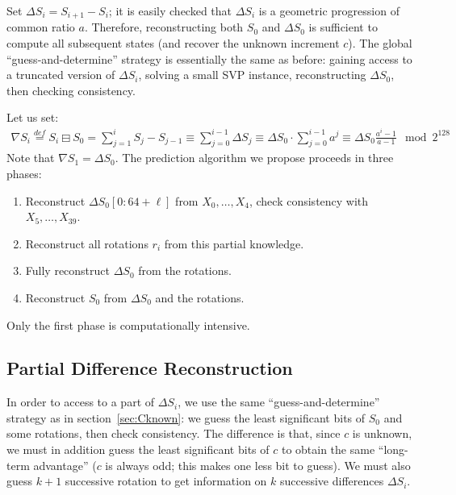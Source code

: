 \documentclass[submission,svgnames,journal=tosc]{iacrtrans}
\begin{document}

Set $\Delta S_i = S_{i+1} - S_i$; it is easily checked that $\Delta S_i$ is a
geometric progression of common ratio $a$. Therefore, reconstructing both $S_0$
and $\Delta S_0$ is sufficient to compute all subsequent states (and recover the
unknown increment $c$). The global ``guess-and-determine'' strategy is
essentially the same as before: gaining access to a truncated version of
$\Delta S_i$, solving a small SVP instance, reconstructing $\Delta S_0$, then
checking consistency.

Let us set:
\begin{align*}
  \nabla S_i \stackrel{def}{=} S_i \boxminus S_0 = \sum_{j=1}^i S_j - S_{j-1} \equiv \sum_{j=0}^{i-1} \Delta S_j \equiv \Delta S_0 \cdot \sum_{j=0}^{i-1} a^j \equiv \Delta S_0 \frac{a^i-1}{a-1} \mod 2^{128}
\end{align*}
Note that $\nabla S_1 = \Delta S_0$. The prediction algorithm we propose proceeds in three phases:
\begin{enumerate}
\item Reconstruct $\Delta S_0[0:64+\ell]$ from $X_0, \dots, X_{4}$, check consistency with $X_5, \dots, X_{39}$.
\item Reconstruct all rotations $r_i$ from this partial knowledge.
\item Fully reconstruct $\Delta S_0$ from the rotations.
\item Reconstruct $S_0$ from $\Delta S_0$ and the rotations.
\end{enumerate}

\noindent Only the first phase is computationally intensive. 

\subsection{Partial Difference Reconstruction}

In order to access to a part of $\Delta S_i$, we use the same
``guess-and-determine'' strategy as in section~\ref{sec:Cknown}: we guess the
least significant bits of $S_0$ and some rotations, then check consistency. The
difference is that, since $c$ is unknown, we must in addition guess the least
significant bits of $c$ to obtain the same ``long-term advantage'' ($c$ is
always odd; this makes one less bit to guess). We must also guess $k+1$
successive rotation to get information on $k$ successive differences
$\Delta S_i$.
\end{document}
